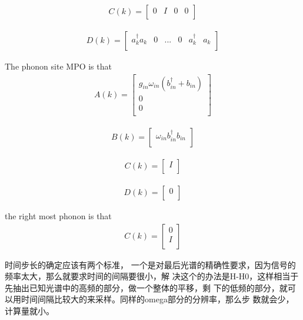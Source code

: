 \documentclass[a4paper,11pt]{ctexart}
\begin{document}
\begin{gather}
C(k) = 
\begin{bmatrix}
    0 & I & 0 & 0 \\ 
\end{bmatrix}
\end{gather}

\begin{gather}
D(k) = 
\begin{bmatrix}
    a^\dagger_k a_k & 0 & ... & 0 & a^\dagger_k & a_k  \\ 
\end{bmatrix}
\end{gather}

The phonon site MPO is that
\begin{gather}
A(k) = 
\begin{bmatrix}
    g_{in} \omega_{in}(b^\dagger_{in}+b_{in})  \\
    0 \\
    0 \\
\end{bmatrix}
\end{gather}

\begin{gather}
B(k) = 
\begin{bmatrix}
    \omega_{in} b^\dagger_{in}b_{in}   \\
\end{bmatrix}
\end{gather}

\begin{gather}
C(k) = 
\begin{bmatrix}
    I \\ 
\end{bmatrix}
\end{gather}

\begin{gather}
D(k) = 
\begin{bmatrix}
     0 \\ 
\end{bmatrix}
\end{gather}

the right most phonon is that
\begin{gather}
C(k) = 
\begin{bmatrix}
    0 \\
    I \\ 
\end{bmatrix}
\end{gather}

时间步长的确定应该有两个标准，
一个是对最后光谱的精确性要求，因为信号的频率太大，那么就要求时间的间隔要很小，解
决这个的办法是H-H0，这样相当于先抽出已知光谱中的高频的部分，做一个整体的平移，剩
下的低频的部分，就可以用时间间隔比较大的来采样。同样的omega部分的分辨率，那么步
数就会少，计算量就小。
\end{document}
